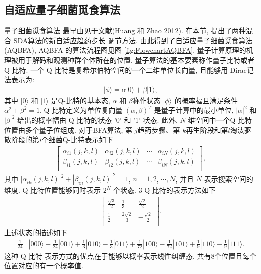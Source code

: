 \subsection{自适应量子细菌觅食算法}
量子细菌觅食算法 最早由见于文献(Huang 和 Zhao 2012). 在本节, 提出了两种混合 SDA算法的新自适应趋药步长 调节方法. 由此得到了自适应量子细菌觅食算法 (AQBFA), AQBFA 的算法流程图见图 \ref{fig:FlowchartAQBFA}.
量子计算原理的机理被用于解码和观测种群个体所在的位置. 量子算法的基本要素称作量子比特或者 Q-比特. 一个 Q-比特是复希尔伯特空间的一个二维单位长向量, 且能够用 Dirac记法表示为:
\begin{gather}
    |\phi\rangle=\alpha|0\rangle+\beta |1\rangle,
\end{gather}
其中 $|0\rangle$ 和 $|1\rangle$ 是Q-比特的基本态, $\alpha$ 和  $\beta$称作状态 $|\phi\rangle$ 的概率福且满足条件 $\alpha^2+\beta^2=1$. Q-比特定义为单位复向量 $(\alpha,\beta)^T$ 是量子计算中的最小单位, $|\alpha|^2$ 和 $|\beta|^2$ 给出的概率幅由 Q-比特的状态 '0' 和 '1' 状态. 此外, $N$-维空间中一个Q-比特位置由多个量子位组成. 对于BFA算法, 第 $j$趋药步骤、第 $k$再生阶段和第$l$淘汰驱散阶段的第$i$个细菌Q-比特表示如下
\begin{align}
\begin{bmatrix}
    \alpha_{i1}(j,k,l) &  \alpha_{i2}(j,k,l)  &  \cdots&  \alpha_{iN}(j,k,l)\\
    \beta_{i1}(j,k,l)&  \beta_{i2}(j,k,l)&  \cdots &  \beta_{iN}(j,k,l)\\
\end{bmatrix},
\end{align}
其中 $|\alpha_{in}(j,k,l)|^2+|\beta_{in}(j,k,l)|^2=1$, $n=1, 2$, $\cdots, N$, 并且 $N$ 表示搜索空间的维度. Q-比特位置能够同时表示 $2^N$ 个状态. 3-Q-比特的表示方法如下
\begin{align*}
\begin{bmatrix}
\frac{\sqrt{3}}{2} &  \frac{1}{3}&  \frac{\sqrt{2}}{2}\\
\frac{1}{2}&  \frac{2\sqrt{2}}{3}&  -\frac{\sqrt{2}}{2}\\
\end{bmatrix}.
\end{align*}
上述状态的描述如下
\begin{align}
  \frac{1}{24}&|0 0 0\rangle-\frac{1}{24}|0 0 1\rangle+\frac{1}{3}|0 10\rangle-\frac{1}{3}|0 11\rangle
    +\frac{1}{72}|100\rangle-\frac{1}{72}|1 01\rangle+\frac{1}{9}|1 10\rangle-\frac{1}{9}|1 11\rangle.
\end{align}
这种 Q-比特 表示方式的优点在于能够以概率表示线性纠缠态, 共有8个位置且每个位置对应的有一个概率值.

